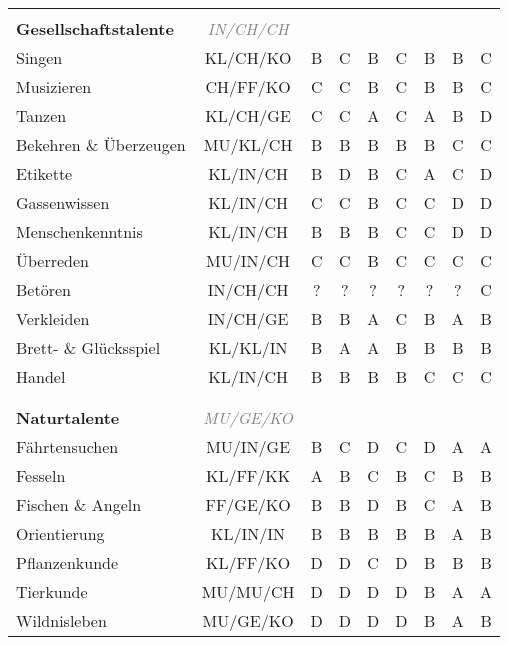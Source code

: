 \begin{center}
\begin{longtable}{|l|c|c|c|c|c|c|c|c|}
\hline
\multicolumn{9}{|l|}{} \\
\multicolumn{1}{|l}{\textbf{Gesellschaftstalente}} & \multicolumn{1}{c}{\textcolor{gray}{\textit{IN/CH/CH}}} & \multicolumn{7}{r|}{} \\
\hline
Singen\footnotemark[1] & KL/CH/KO & B & C & B & C & B & B & C \\
\hline
Musizieren\footnotemark[1] & CH/FF/KO & C & C & B & C & B & B & C \\
\hline
Tanzen\footnotemark[1] & KL/CH/GE & C & C & A & C & A & B & D \\
\hline
Bekehren \& Überzeugen & MU/KL/CH & B & B & B & B & B & C & C \\
\hline
Etikette\footnotemark[1] & KL/IN/CH & B & D & B & C & A & C & D \\
\hline
Gassenwissen & KL/IN/CH & C & C & B & C & C & D & D \\
\hline
Menschenkenntnis & KL/IN/CH & B & B & B & C & C & D & D \\
\hline
Überreden & MU/IN/CH & C & C & B & C & C & C & C \\
\hline
Betören\footnotemark[1] & IN/CH/CH & ? & ? & ? & ? & ? & ? & C\footnotemark[2] \\
\hline
Verkleiden & IN/CH/GE & B & B & A & C & B & A & B \\
\hline
Brett- \& Glücksspiel & KL/KL/IN & B & A & A & B & B & B & B \\
\hline
Handel\footnotemark[1] & KL/IN/CH & B & B & B & B & C & C & C \\


\hline
\multicolumn{9}{|l|}{} \\
\multicolumn{9}{|l|}{} \\
\hline
\multicolumn{1}{|l}{\textbf{Naturtalente}} & \multicolumn{1}{c}{\textcolor{gray}{\textit{MU/GE/KO}}} & \multicolumn{7}{r|}{} \\
\hline
Fährtensuchen & MU/IN/GE & B & C & D & C & D & A & A \\
\hline
Fesseln & KL/FF/KK & A & B & C & B & C & B & B \\
\hline
Fischen \& Angeln & FF/GE/KO & B & B & D & B & C & A & B \\
\hline
Orientierung & KL/IN/IN & B & B & B & B & B & A & B \\
\hline
Pflanzenkunde & KL/FF/KO & D & D & C & D & B & B & B \\
\hline
Tierkunde & MU/MU/CH & D & D & D & D & B & A & A \\
\hline
Wildnisleben & MU/GE/KO & D & D & D & D & B & A & B \\



\end{longtable}
\end{center}
